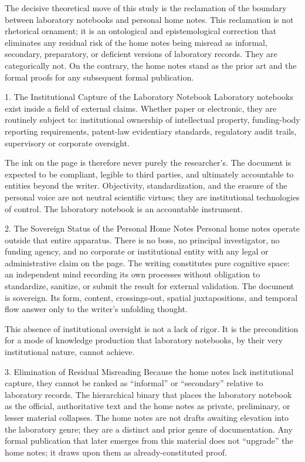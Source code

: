 The decisive theoretical move of this study is the reclamation of the boundary between laboratory notebooks and personal home notes. This reclamation is not rhetorical ornament; it is an ontological and epistemological correction that eliminates any residual risk of the home notes being misread as informal, secondary, preparatory, or deficient versions of laboratory records. They are categorically not. On the contrary, the home notes stand as the prior art and the formal proofs for any subsequent formal publication.

1. The Institutional Capture of the Laboratory Notebook
Laboratory notebooks exist inside a field of external claims. Whether paper or electronic, they are routinely subject to:
institutional ownership of intellectual property,
funding-body reporting requirements,
patent-law evidentiary standards,
regulatory audit trails,
supervisory or corporate oversight.

The ink on the page is therefore never purely the researcher’s. The document is expected to be compliant, legible to third parties, and ultimately accountable to entities beyond the writer. Objectivity, standardization, and the erasure of the personal voice are not neutral scientific virtues; they are institutional technologies of control. The laboratory notebook is an accountable instrument.

2. The Sovereign Status of the Personal Home Notes
Personal home notes operate outside that entire apparatus.  
There is no boss, no principal investigator, no funding agency, and no corporate or institutional entity with any legal or administrative claim on the page.  
The writing constitutes pure cognitive space: an independent mind recording its own processes without obligation to standardize, sanitize, or submit the result for external validation.  
The document is sovereign. Its form, content, crossings-out, spatial juxtapositions, and temporal flow answer only to the writer’s unfolding thought.

This absence of institutional oversight is not a lack of rigor. It is the precondition for a mode of knowledge production that laboratory notebooks, by their very institutional nature, cannot achieve.

3. Elimination of Residual Misreading
Because the home notes lack institutional capture, they cannot be ranked as “informal” or “secondary” relative to laboratory records. The hierarchical binary that places the laboratory notebook as the official, authoritative text and the home notes as private, preliminary, or lesser material collapses. The home notes are not drafts awaiting elevation into the laboratory genre; they are a distinct and prior genre of documentation. Any formal publication that later emerges from this material does not “upgrade” the home notes; it draws upon them as already-constituted proof.

